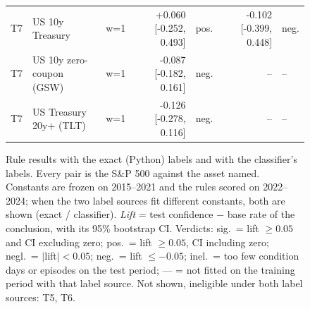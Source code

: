 \begin{figure}[t]
{\begin{tabular}{lllrlrl}
T7 & US 10y Treasury & w=1 & +0.060 [-0.252, 0.493] & pos. & -0.102 [-0.399, 0.448] & neg. \\
T7 & US 10y zero-coupon (GSW) & w=1 & -0.087 [-0.182, 0.161] & neg. & -- & -- \\
T7 & US Treasury 20y+ (TLT) & w=1 & -0.126 [-0.278, 0.116] & neg. & -- & -- \\
\bottomrule
\end{tabular}
}
\caption{Rule results with the exact (Python) labels and with the classifier's labels. Every pair is the S\&P 500 against the asset named. Constants are frozen on 2015--2021 and the rules scored on 2022--2024; when the two label sources fit different constants, both are shown (exact / classifier). \emph{Lift} = test confidence $-$ base rate of the conclusion, with its 95\% bootstrap CI. Verdicts: sig.\ = lift $\geq 0.05$ and CI excluding zero; pos.\ = lift $\geq 0.05$, CI including zero; negl.\ = $|$lift$| < 0.05$; neg.\ = lift $\leq -0.05$; inel.\ = too few condition days or episodes on the test period; --- = not fitted on the training period with that label source. Not shown, ineligible under both label sources: T5, T6.}
\label{tab:rule-results-combined}
\end{figure}
